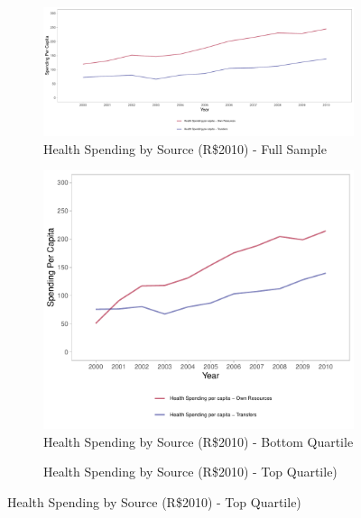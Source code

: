 \begin{figure}[h]
    \begin{center}
    \caption{\footnotesize Health Spending Trends}\label{fig:3}
    \begin{subfigure}{.9\textwidth}
        \caption{\scriptsize Health Spending by Source (R\$2010) - Full Sample}\label{fig:3a}
        \centering
        \includegraphics[width=\textwidth]{plots/plot_siops_level_source.pdf}
    \end{subfigure}
        \begin{subfigure}{0.45\textwidth}
        \caption{\scriptsize Health Spending by Source (R\$2010) - Bottom Quartile}\label{fig:3b}
        \centering
        \includegraphics[width=\textwidth]{plots/plot_siops_level_source_bottom.pdf}
    \end{subfigure}
        \begin{subfigure}{0.45\textwidth}
        \caption{\scriptsize Health Spending by Source (R\$2010) - Top Quartile)}\label{fig:3c}

\end{subfigure}
\end{center}
\end{figure}
